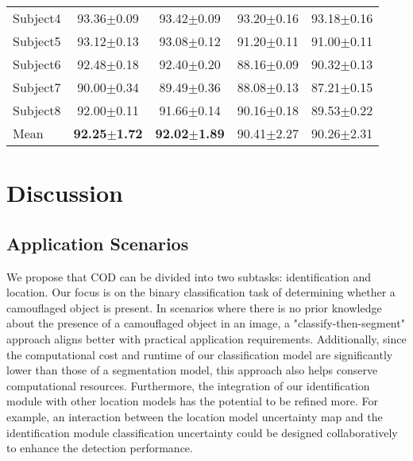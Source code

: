 \documentclass[preprint,12pt,authoryear]{elsarticle}
\begin{document}
\begin{table*}[ht]
\begin{tabular*}{\textwidth}{@{\extracolsep\fill}lcccc}
Subject4 & 93.36$\pm$0.09 & 93.42$\pm$0.09 & 93.20$\pm$0.16 & 93.18$\pm$0.16\\
Subject5 & 93.12$\pm$0.13 & 93.08$\pm$0.12 & 91.20$\pm$0.11 & 91.00$\pm$0.11\\
Subject6 & 92.48$\pm$0.18 & 92.40$\pm$0.20 & 88.16$\pm$0.09 & 90.32$\pm$0.13\\
Subject7 & 90.00$\pm$0.34 & 89.49$\pm$0.36 & 88.08$\pm$0.13 & 87.21$\pm$0.15\\
Subject8 & 92.00$\pm$0.11 & 91.66$\pm$0.14 & 90.16$\pm$0.18 & 89.53$\pm$0.22\\
Mean & \textbf{92.25$\pm$1.72} & \textbf{92.02$\pm$1.89} & 90.41$\pm$2.27 & 90.26$\pm$2.31\\
\bottomrule
\end{tabular*}
\end{table*}

\section{Discussion}

%
\subsection{Application Scenarios}
We propose that COD can be divided into two subtasks: identification and location. Our focus is on the binary classification task of determining whether a camouflaged object is present. In scenarios where there is no prior knowledge about the presence of a camouflaged object in an image, a "classify-then-segment" approach aligns better with practical application requirements. Additionally, since the computational cost and runtime of our classification model are significantly lower than those of a segmentation model, this approach also helps conserve computational resources. Furthermore, the integration of our identification module with other location models has the potential to be refined more. For example, an interaction between the location model uncertainty map and the identification module classification uncertainty could be designed collaboratively to enhance the detection performance.

\end{document}
